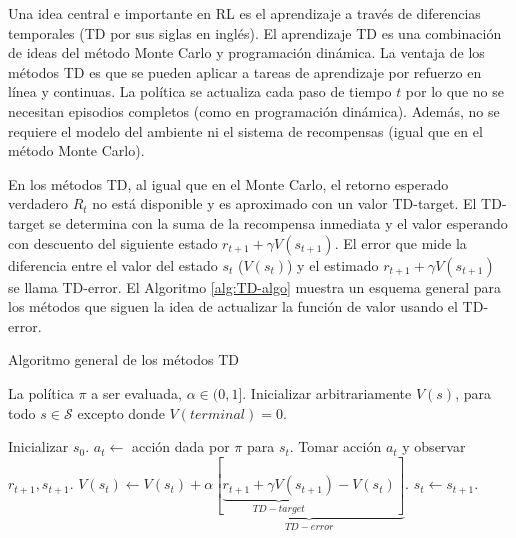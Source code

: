 Una idea central e importante en RL es el aprendizaje 
a través de diferencias temporales (TD por sus siglas en inglés).
El aprendizaje TD es una combinación de ideas del método Monte Carlo y programación dinámica. 
La ventaja de los métodos TD es que se pueden aplicar a tareas de aprendizaje por refuerzo en línea y continuas.
La política se actualiza cada paso de tiempo $t$ por lo que no se necesitan
 episodios completos (como en programación dinámica). Además, no se requiere el modelo del ambiente ni el sistema de recompensas (igual que en el método Monte Carlo).


En los métodos TD, al igual que en el Monte Carlo, el retorno esperado verdadero $R_t$ no está disponible
y es aproximado con un valor TD-target. El TD-target se determina con la suma de la recompensa inmediata y el valor esperando con descuento del 
siguiente estado $r_{t+1} + \gamma V(s_{t+1})$. El error que mide la diferencia entre el valor del estado $s_t$ ($V(s_t)$) y el estimado $r_{t+1} + \gamma V(s_{t+1})$ se llama TD-error. El Algoritmo \ref{alg:TD-algo} muestra un esquema general para los métodos que siguen la idea de actualizar la función de valor usando el TD-error.

\begin{mialgoritmo}[H]
  	\caption{Algoritmo general de los métodos TD}
	\label{alg:TD-algo}
  \begin{algorithmic}[1]
  \REQUIRE La política $\pi$ a ser evaluada, $\alpha \in (0,1]$.
  \STATE Inicializar arbitrariamente $V(s)$, para todo $s\in \mathcal{S}$ excepto donde $V(terminal) = 0$.
  
    \STATE Inicializar $s_0$.
    \STATE $a_{t} \leftarrow$ acción dada por $\pi$ para $s_t$.
    \STATE Tomar acción $a_t$ y observar $r_{t+1}, s_{t+1}$.
    \STATE $V(s_t) \leftarrow V(s_t) + \alpha\underbrace{[\underbrace{r_{t+1} + \gamma V(s_{t+1})}_{TD-target} - V(s_t)]}_{TD-error}$.
    \STATE $s_t \leftarrow s_{t+1}$.
    \ENDFOR
  \ENDFOR
  \end{algorithmic}
\end{mialgoritmo}




